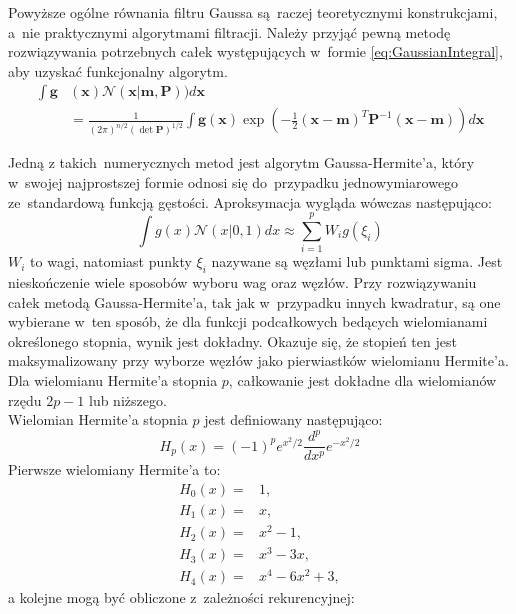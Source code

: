 \par
Powyższe ogólne równania filtru Gaussa są~raczej teoretycznymi konstrukcjami, a~nie praktycznymi algorytmami filtracji. Należy przyjąć pewną metodę rozwiązywania potrzebnych całek występujących w~formie \ref{eq:GaussianIntegral}, aby uzyskać funkcjonalny algorytm.
\begin{align} \label{eq:GaussianIntegral}
	\int \boldsymbol{g}&(\boldsymbol{x})\mathcal{N}(\boldsymbol{x}|\boldsymbol{m},\boldsymbol{P})) d\boldsymbol{x}
	\nonumber \\
	&=\frac{1}{(2\pi)^{n/2}(\det\boldsymbol{P})^{1/2}}\int \boldsymbol{g}(\boldsymbol{x})\exp (-\frac{1}{2}(\boldsymbol{x - \boldsymbol{m}})^T\boldsymbol{P}^{-1}(\boldsymbol{x - \boldsymbol{m}})) d\boldsymbol{x}
\end{align}
\par
Jedną z takich~numerycznych metod jest algorytm Gaussa-Hermite'a, który w~swojej najprostszej formie odnosi się do~przypadku jednowymiarowego ze~standardową funkcją gęstości. Aproksymacja wygląda wówczas następująco:
\begin{equation}
	\int g(x)\mathcal{N}(x|0,1)dx \approx \sum_{i=1}^{p} W_i g(\xi_i)
\end{equation}
$W_i$ to wagi, natomiast punkty $\xi_i$ nazywane są węzłami lub punktami sigma. Jest nieskończenie wiele sposobów wyboru wag oraz węzłów. Przy rozwiązywaniu całek metodą Gaussa-Hermite'a, tak jak w~przypadku innych kwadratur, są one wybierane w~ten sposób, że dla funkcji podcałkowych bedących wielomianami określonego stopnia, wynik jest dokładny. Okazuje się, że stopień ten jest maksymalizowany przy wyborze węzłów jako pierwiastków wielomianu Hermite'a. Dla wielomianu Hermite'a stopnia $p$, całkowanie jest dokładne dla wielomianów rzędu $2p-1$ lub niższego.
\\
Wielomian Hermite'a stopnia $p$ jest definiowany następująco:
\begin{equation}
	H_p(x)=(-1)^pe^{x^2/2}\frac{d^p}{dx^p}e^{-x^2/2}
\end{equation}
Pierwsze wielomiany Hermite'a to:
\begin{align} \label{eq:FirstHermitePolynomials}
H_0(x)=&1, \nonumber \\
H_1(x)=&x, \nonumber \\
H_2(x)=&x^2-1, \nonumber \\
H_3(x)=&x^3-3x, \nonumber \\
H_4(x)=&x^4-6x^2+3,
\end{align}
a kolejne mogą być obliczone z~zależności rekurencyjnej:
